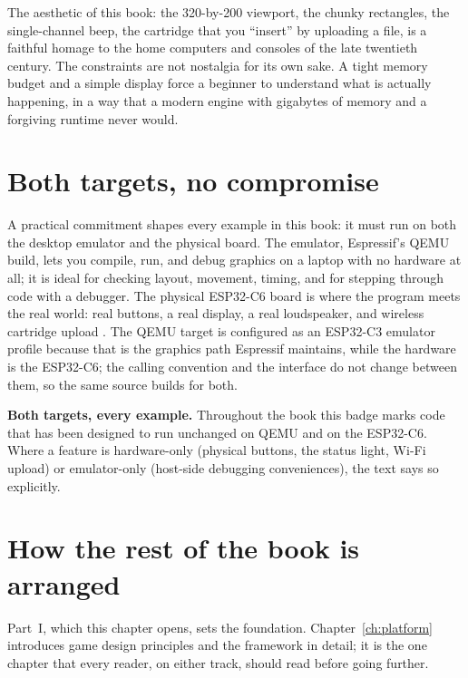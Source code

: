 \begin{prgaside}
The aesthetic of this book: the 320-by-200 viewport, the chunky rectangles, the
single-channel beep, the cartridge that you ``insert'' by uploading a
 file, is a faithful homage to the home computers and consoles of
the late twentieth century. The constraints are not nostalgia for its own sake.
A tight memory budget and a simple display force a beginner to understand what is
actually happening, in a way that a modern engine with gigabytes of memory and a
forgiving runtime never would.
\end{prgaside}

\section{Both targets, no compromise}

A practical commitment shapes every example in this book: it must run on both the
desktop emulator and the physical board. The emulator, Espressif's QEMU build,
lets you compile, run, and debug graphics on a laptop with no hardware at all; it
is ideal for checking layout, movement, timing, and for stepping through code
with a debugger. The physical ESP32\nobreakdash-C6 board is where the program meets the
real world: real buttons, a real display, a real loudspeaker, and wireless cartridge
upload \citep{prg32qemu}. The QEMU target is configured as an ESP32\nobreakdash-C3 emulator
profile because that is the \riscv graphics path Espressif maintains, while the
hardware is the ESP32\nobreakdash-C6; the \riscv calling convention and the \prg interface
do not change between them, so the same source builds for both.

\begin{prgtargets}
\textbf{Both targets, every example.} Throughout the book this badge marks code
that has been designed to run unchanged on QEMU and on the ESP32\nobreakdash-C6. Where a
feature is hardware-only (physical buttons, the status light, Wi-Fi upload) or
emulator-only (host-side debugging conveniences), the text says so explicitly.
\end{prgtargets}

\section{How the rest of the book is arranged}

Part~I, which this chapter opens, sets the foundation. Chapter~\ref{ch:platform}
introduces game design principles and the \prg framework in detail; it is the one
chapter that every reader, on either track, should read before going further.

